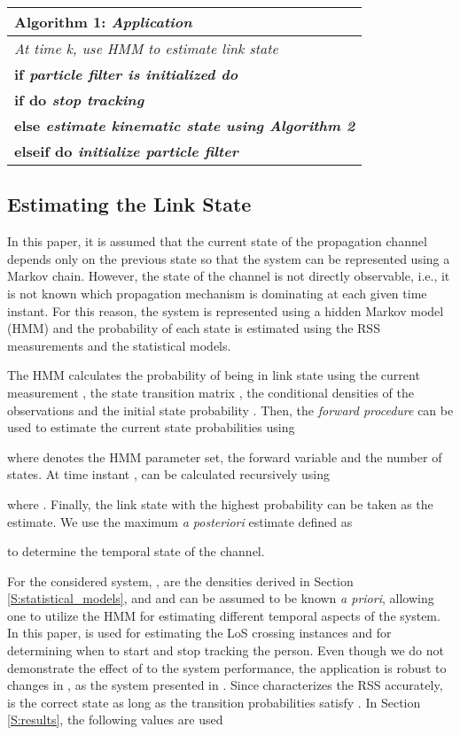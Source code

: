 \documentclass[journal, 10pt, twocolumn, balance]{IEEEtran}
\begin{document}
\begin{center}
\renewcommand{\arraystretch}{1.2}\begin{tabular}{ l }
    \hline\hline
	\bf{Algorithm 1: } \it{Application} \\
    \hline
	\it{At time k, use HMM to estimate link state } \\
	\bf{if} \it{particle filter is initialized} \bf{do} \\
		\quad \bf{if}  \bf{do} \it{stop tracking} \\
		\quad \bf{else} \it{estimate kinematic state}  \it{using} \bf{Algorithm 2}\\
	\bf{elseif}  \bf{do} \it{initialize particle filter} \\
	\hline
  \end{tabular}
\end{center}



\subsection{Estimating the Link State}

In this paper, it is assumed that the current state of the propagation channel depends only on the previous state so that the system can be represented using a Markov chain. However, the state of the channel is not directly observable, i.e., it is not known which propagation mechanism is dominating at each given time instant. For this reason, the system is represented using a hidden Markov model (HMM) and the probability of each state is estimated using the RSS measurements and the statistical models.

The HMM calculates the probability of being in link state  using the current measurement , the state transition matrix , the conditional densities of the observations  and the initial state probability . Then, the \emph{forward procedure} \cite[pp. 109-114]{Therrien1992} can be used to estimate the current state probabilities using

where  denotes the HMM parameter set,  the forward variable and  the number of states. At time instant ,  can be calculated recursively using

where . Finally, the link state with the highest probability can be taken as the estimate. We use the maximum \emph{a posteriori} estimate defined as 

to determine the temporal state of the channel.


For the considered system, ,  are the densities derived in Section \ref{S:statistical_models}, and  and  can be assumed to be known \emph{a priori}, allowing one to utilize the HMM for estimating different temporal aspects of the system. In this paper,  is used for estimating the LoS crossing instances and for determining when to start and stop tracking the person. Even though we do not demonstrate the effect of  to the system performance, the application is robust to changes in , as the system presented in \cite{kaltiokallio2014}. Since  characterizes the RSS accurately,  is the correct state as long as the transition probabilities satisfy . In Section \ref{S:results}, the following values are used
\end{document}
